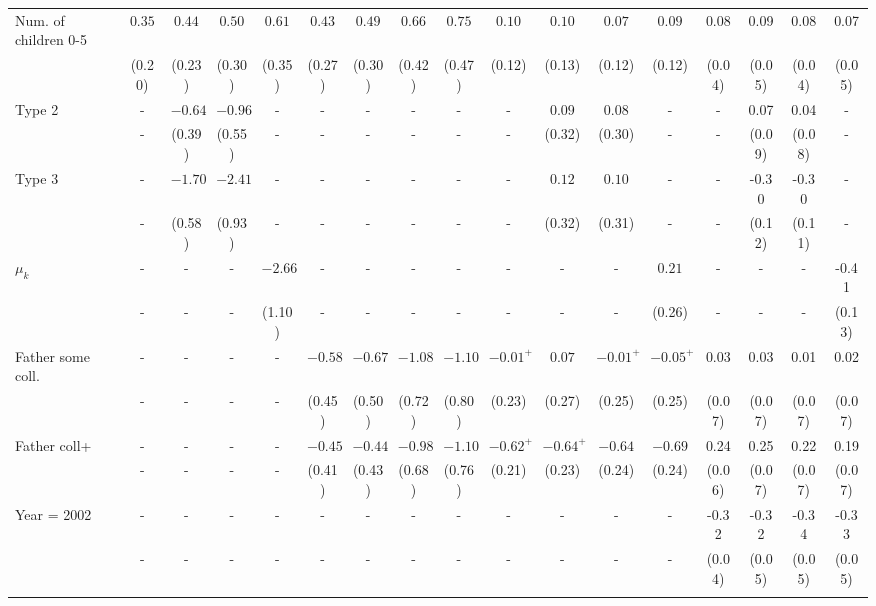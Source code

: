 \begin{tabular}{lcccccccccccccccc}
Num. of children 0-5&$0.35$&$0.44$&$0.50$&$0.61$&$0.43$&$0.49$&$0.66$&$0.75$&$0.10$&$0.10$&$0.07$&$0.09$&0.08&0.09&0.08&0.07\\
&(0.20)&(0.23)&(0.30)&(0.35)&(0.27)&(0.30)&(0.42)&(0.47)&(0.12)&(0.13)&(0.12)&(0.12)&(0.04)&(0.05)&(0.04)&(0.05)\\
Type 2&-&$-0.64$&$-0.96$&-&-&-&-&-&-&$0.09$&$0.08$&-&-&0.07&0.04&-\\
&-&(0.39)&(0.55)&-&-&-&-&-&-&(0.32)&(0.30)&-&-&(0.09)&(0.08)&-\\
Type 3&-&$-1.70$&$-2.41$&-&-&-&-&-&-&$0.12$&$0.10$&-&-&-0.30&-0.30&-\\
&-&(0.58)&(0.93)&-&-&-&-&-&-&(0.32)&(0.31)&-&-&(0.12)&(0.11)&-\\
$\mu_{k}$&-&-&-&$-2.66$&-&-&-&-&-&-&-&$0.21$&-&-&-&-0.41\\
&-&-&-&(1.10)&-&-&-&-&-&-&-&(0.26)&-&-&-&(0.13)\\
Father some coll.&-&-&-&-&$-0.58$&$-0.67$&$-1.08$&$-1.10$&$-0.01^{+}$&$0.07$&$-0.01^{+}$&$-0.05^{+}$&0.03&0.03&0.01&0.02\\
&-&-&-&-&(0.45)&(0.50)&(0.72)&(0.80)&(0.23)&(0.27)&(0.25)&(0.25)&(0.07)&(0.07)&(0.07)&(0.07)\\
Father coll+&-&-&-&-&$-0.45$&$-0.44$&$-0.98$&$-1.10$&$-0.62^{+}$&$-0.64^{+}$&$-0.64$&$-0.69$&0.24&0.25&0.22&0.19\\
&-&-&-&-&(0.41)&(0.43)&(0.68)&(0.76)&(0.21)&(0.23)&(0.24)&(0.24)&(0.06)&(0.07)&(0.07)&(0.07)\\
Year = 2002&-&-&-&-&-&-&-&-&-&-&-&-&-0.32&-0.32&-0.34&-0.33\\
&-&-&-&-&-&-&-&-&-&-&-&-&(0.04)&(0.05)&(0.05)&(0.05)\\
\\
\bottomrule\end{tabular}